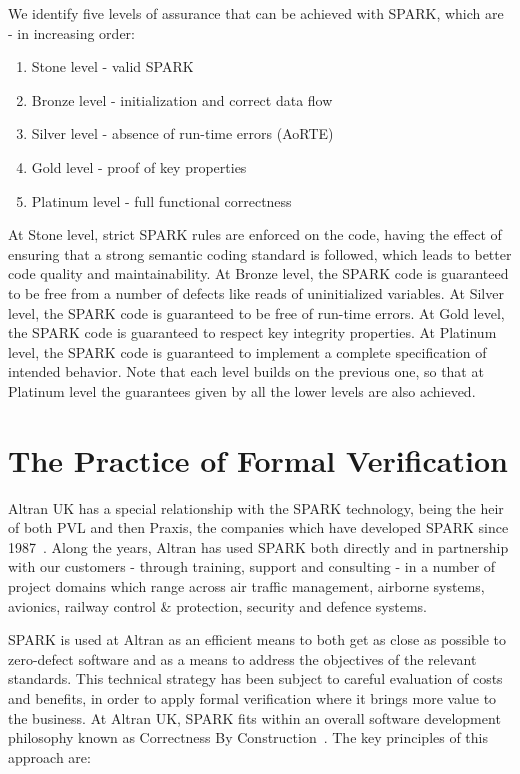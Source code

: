 \documentclass{llncs}
\begin{document}
We identify five levels of assurance that can be achieved with SPARK, which are
- in increasing order:

\begin{enumerate}
\item Stone level - valid SPARK
\item Bronze level - initialization and correct data flow
\item Silver level - absence of run-time errors (AoRTE)
\item Gold level - proof of key properties
\item Platinum level - full functional correctness
\end{enumerate}

At Stone level, strict SPARK rules are enforced on the code, having the effect
of ensuring that a strong semantic coding standard is followed, which leads to
better code quality and maintainability. At Bronze level, the SPARK code is
guaranteed to be free from a number of defects like reads of uninitialized
variables. At Silver level, the SPARK code is guaranteed to be free of run-time
errors. At Gold level, the SPARK code is guaranteed to respect key integrity
properties. At Platinum level, the SPARK code is guaranteed to implement a
complete specification of intended behavior. Note that each level builds on the
previous one, so that at Platinum level the guarantees given by all the lower
levels are also achieved.

\section{The Practice of Formal Verification}

Altran UK has a special relationship with the SPARK technology, being the heir
of both PVL and then Praxis, the companies which have developed SPARK since
1987~\cite{Chapman2014}. Along the years, Altran has used SPARK both directly
and in partnership with our customers - through training, support and
consulting - in a number of project domains which range across air traffic
management, airborne systems, avionics, railway control \& protection, security
and defence systems.

SPARK is used at Altran as an efficient means to both get as close as possible
to zero-defect software and as a means to address the objectives of the
relevant standards. This technical strategy has been subject to careful
evaluation of costs and benefits, in order to apply formal verification where
it brings more value to the business. At Altran UK, SPARK fits within an
overall software development philosophy known as Correctness By
Construction~\cite{Croxford2005Manifesto}. The key principles of this approach
are:
\end{document}
